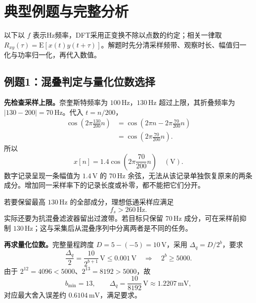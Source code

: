 \clearpage
\section{典型例题与完整分析}
\label{sec:ch6-worked-examples}

\noindent 以下以 $f$ 表示Hz频率，DFT采用正变换不除以点数的约定；相关一律取 $R_{xy}(\tau)=\mathrm E[x(t)y(t+\tau)]$。解题时先分清采样频带、观察时长、幅值归一化与功率归一化，再代入数值。

\subsection{例题1：混叠判定与量化位数选择}


\sol
\textbf{先检查采样上限。}奈奎斯特频率为 $100\,\mathrm{Hz}$，$130\,\mathrm{Hz}$ 超过上限，其折叠频率为 $|130-200|=70\,\mathrm{Hz}$。代入 $t=n/200$，
\begin{align*}
\cos\left(2\pi\frac{130}{200}n\right)
&=\cos\left(2\pi n-2\pi\frac{70}{200}n\right)\\
&=\cos\left(2\pi\frac{70}{200}n\right).
\end{align*}
所以
\[
\boxed{x[n]=1.4\cos\left(2\pi\frac{70}{200}n\right)\quad(\mathrm V)}.
\]
数字记录呈现一条幅值为 $1.4\,\mathrm V$ 的 $70\,\mathrm{Hz}$ 余弦，无法从该记录单独恢复原来的两条成分。增加同一采样率下的记录长度或补零，都不能把它们分开。

若要保留最高 $130\,\mathrm{Hz}$ 的全部成分，理想低通采样应满足
\[
\boxed{f_s>260\,\mathrm{Hz}}.
\]
实际还要为抗混叠滤波器留出过渡带。若目标只保留 $70\,\mathrm{Hz}$ 成分，可在采样前抑制 $130\,\mathrm{Hz}$；这与采集后从混叠序列中分离两者是不同的任务。

\textbf{再求量化位数。}完整量程跨度 $D=5-(-5)=10\,\mathrm V$，采用 $\Delta_q=D/2^b$，要求
\[
\frac{\Delta_q}{2}=\frac{10}{2^{b+1}}\,\mathrm V\leq0.001\,\mathrm V
\quad\Longrightarrow\quad 2^b\geq5000.
\]
由于 $2^{12}=4096<5000$、$2^{13}=8192>5000$，故
\[
\boxed{b_{\min}=13},\qquad
\Delta_q=\frac{10}{8192}\,\mathrm V\approx1.2207\,\mathrm{mV},
\]
对应最大舍入误差约 $0.6104\,\mathrm{mV}$，满足要求。

